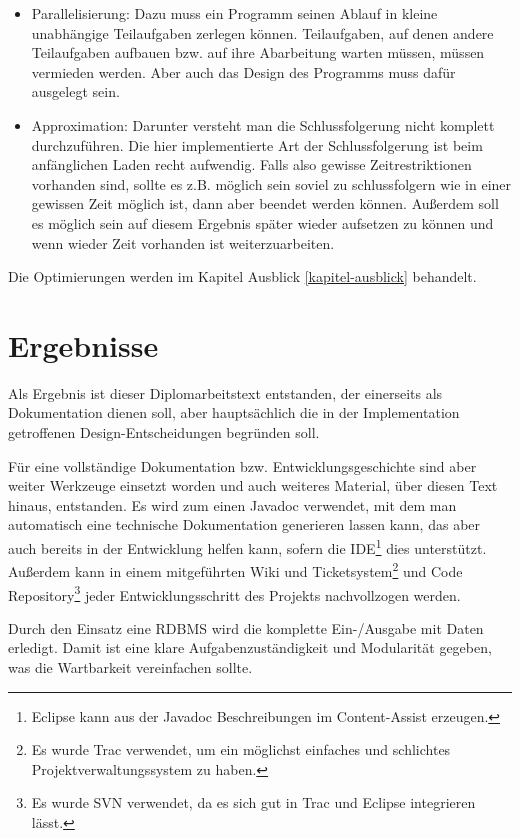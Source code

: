 \begin{itemize}
  \item Parallelisierung: Dazu muss ein Programm seinen Ablauf in kleine unabhängige Teilaufgaben zerlegen können. Teilaufgaben, auf denen andere Teilaufgaben aufbauen bzw. auf ihre Abarbeitung warten müssen, müssen vermieden werden. Aber auch das Design des Programms muss dafür ausgelegt sein.
  \item Approximation: Darunter versteht man die Schlussfolgerung nicht komplett durchzuführen. Die hier implementierte Art der Schlussfolgerung ist beim anfänglichen Laden recht aufwendig. Falls also gewisse Zeitrestriktionen vorhanden sind, sollte es z.B. möglich sein soviel zu schlussfolgern wie in einer gewissen Zeit möglich ist, dann aber beendet werden können. Außerdem soll es möglich sein auf diesem Ergebnis später wieder aufsetzen zu können und wenn wieder Zeit vorhanden ist weiterzuarbeiten.
\end{itemize}

Die Optimierungen werden im Kapitel Ausblick \ref{kapitel-ausblick} behandelt.

\section{Ergebnisse}
Als Ergebnis ist dieser Diplomarbeitstext entstanden, der einerseits als Dokumentation dienen soll, aber hauptsächlich die in der Implementation getroffenen Design-Entscheidungen begründen soll.

Für eine vollständige Dokumentation bzw. Entwicklungsgeschichte sind aber weiter Werkzeuge einsetzt worden und auch weiteres Material, über diesen Text hinaus, entstanden. Es wird zum einen Javadoc verwendet, mit dem man automatisch eine technische Dokumentation generieren lassen kann, das aber auch bereits in der Entwicklung helfen kann, sofern die IDE\footnote{Eclipse kann aus der Javadoc Beschreibungen im Content-Assist erzeugen.} dies unterstützt. Außerdem kann in einem mitgeführten Wiki und Ticketsystem\footnote{Es wurde Trac verwendet, um ein möglichst einfaches und schlichtes Projektverwaltungssystem zu haben.} und Code Repository\footnote{Es wurde SVN verwendet, da es sich gut in Trac und Eclipse integrieren lässt.} jeder Entwicklungsschritt des Projekts nachvollzogen werden.

Durch den Einsatz eine RDBMS wird die komplette Ein-/Ausgabe mit Daten erledigt. Damit ist eine klare Aufgabenzuständigkeit und Modularität gegeben, was die Wartbarkeit vereinfachen sollte. 

